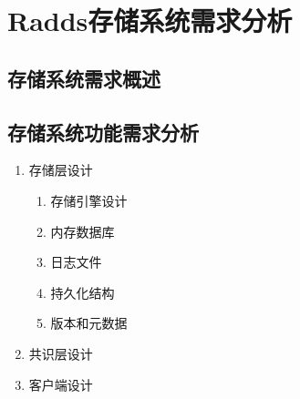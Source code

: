\section{Radds存储系统需求分析}
	\subsection{存储系统需求概述}
  	
     
     
     
	\subsection{存储系统功能需求分析}
  
  
	\begin{enumerate}[fullwidth,itemindent=2em,listparindent=2em]
	
    \item 存储层设计

    	\begin{enumerate}
			\item 存储引擎设计
			\item 内存数据库
			\item 日志文件
			\item 持久化结构
			\item 版本和元数据
		\end{enumerate}

    \item 共识层设计
    


    \item 客户端设计
   


	\end{enumerate}
    

\clearpage